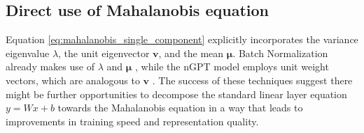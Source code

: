 \subsection{Direct use of Mahalanobis equation}

Equation \ref{eq:mahalanobis_single_component} explicitly incorporates the variance eigenvalue $\lambda$, the unit eigenvector $\mathbf{v}$, and the mean $\boldsymbol{\mu}$. Batch Normalization already makes use of $\lambda$ and $\boldsymbol{\mu}$ \citep{ioffe2015batch}, while the nGPT model employs unit weight vectors, which are analogous to $\mathbf{v}$ \citep{loshchilov2024ngptnormalizedtransformerrepresentation}. The success of these techniques suggest there might be further opportunities to decompose the standard linear layer equation $y = Wx + b$ towards the Mahalanobis equation in a way that leads to improvements in training speed and representation quality.

